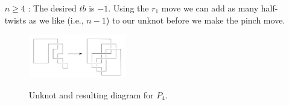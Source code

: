 \begin{itemize}
    \item[$n \geq 4$ :]
        The desired $tb$ is $-1$. Using the $r_1$ move we can add as many half-twists as we like (i.e., $n - 1$) to our unknot before we make the pinch move.
        \begin{figure}[h!]
            \centering
            \includegraphics[width=0.4\textwidth]{images/pretzel-+4-construction.pdf}
            \label{fig:pretzel+4}
            \caption{Unknot and resulting diagram for $P_{4}$.}
        \end{figure}

\end{itemize}
